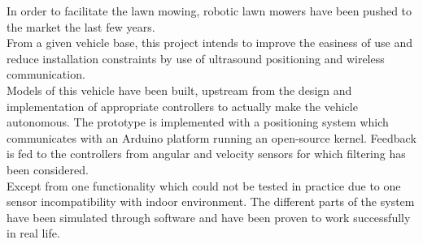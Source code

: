 In order to facilitate the lawn mowing, robotic lawn mowers have been pushed to the market the last few years.\\
From a given vehicle base, this project intends to improve the easiness of use and reduce installation constraints by use of ultrasound positioning and wireless communication.\\
Models of this vehicle have been built, upstream from the design and implementation of appropriate controllers to actually make the vehicle autonomous. The prototype is implemented with a positioning system which communicates with an Arduino platform running an open-source kernel. Feedback is fed to the controllers from angular and velocity sensors for which filtering has been considered.\\
Except from one functionality which could not be tested in practice due to one sensor incompatibility with indoor environment. The different parts of the system have been simulated through software and have been proven to work successfully in real life.